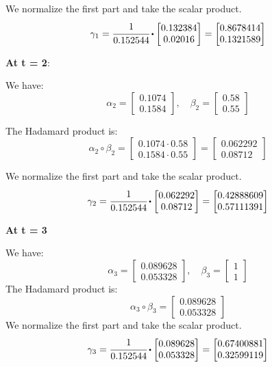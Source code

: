 We normalize the first part and take the scalar product.
\[
\gamma_1 = \cfrac{1}{0.152544} \bigcdot \begin{bmatrix}
    0.132384 \\ 0.02016
\end{bmatrix} = \begin{bmatrix}
    0.8678414 \\ 0.1321589
\end{bmatrix}
\]

\textbf{At t = 2}:

We have:
\[
\alpha_2 = \begin{bmatrix}
    0.1074 \\ 0.1584
\end{bmatrix}, \quad \beta_2 = \begin{bmatrix}
    0.58 \\ 0.55
\end{bmatrix}
\]

The Hadamard product is:
\[
\alpha_2 \circ \beta_2 = \begin{bmatrix}
    0.1074 \cdot 0.58 \\ 0.1584 \cdot 0.55
\end{bmatrix} = \begin{bmatrix}
    0.062292 \\ 0.08712
\end{bmatrix}
\]

We normalize the first part and take the scalar product.
\[
\gamma_2 = \cfrac{1}{0.152544} \bigcdot \begin{bmatrix}
    0.062292 \\ 0.08712 \end{bmatrix} = \begin{bmatrix}
        0.42888609 \\ 0.57111391
    \end{bmatrix}
\]

\textbf{At t = 3}

We have: 
\[
\alpha_3 = \begin{bmatrix}
    0.089628 \\ 0.053328
\end{bmatrix}, \quad \beta_3 = \begin{bmatrix}
    1 \\ 1
\end{bmatrix}
\]
The Hadamard product is:
\[
\alpha_3 \circ \beta_3 = \begin{bmatrix}
0.089628 \\ 0.053328
\end{bmatrix}
\]
We normalize the first part and take the scalar product.
\[
\gamma_3 = \cfrac{1}{0.152544} \bigcdot \begin{bmatrix}
    0.089628 \\ 0.053328 \end{bmatrix} = \begin{bmatrix}
        0.67400881 \\ 0.32599119
    \end{bmatrix}
\]


